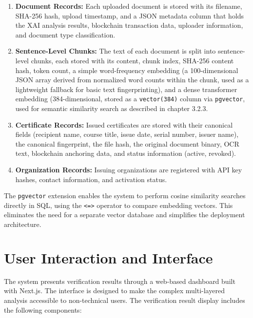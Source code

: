             \begin{enumerate}
                \item \textbf{Document Records:} Each uploaded document is stored with its filename, SHA-256 hash, upload timestamp, and a JSON metadata column that holds the XAI analysis results, blockchain transaction data, uploader information, and document type classification.
            
                \item \textbf{Sentence-Level Chunks:} The text of each document is split into sentence-level chunks, each stored with its content, chunk index, SHA-256 content hash, token count, a simple word-frequency embedding (a 100-dimensional JSON array derived from normalized word counts within the chunk, used as a lightweight fallback for basic text fingerprinting), and a dense transformer embedding (384-dimensional, stored as a \texttt{vector(384)} column via \texttt{pgvector}, used for semantic similarity search as described in chapter 3.2.3.
            
                \item \textbf{Certificate Records:} Issued certificates are stored with their canonical fields (recipient name, course title, issue date, serial number, issuer name), the canonical fingerprint, the file hash, the original document binary, OCR text, blockchain anchoring data, and status information (active, revoked).
            
                \item \textbf{Organization Records:} Issuing organizations are registered with API key hashes, contact information, and activation status.
            \end{enumerate}
            
            The \texttt{pgvector} extension enables the system to perform cosine similarity searches directly in SQL, using the \texttt{<=>} operator to compare embedding vectors. This eliminates the need for a separate vector database and simplifies the deployment architecture.
        
        \section{User Interaction and Interface}
        \label{sec:user_interface}

            The system presents verification results through a web-based dashboard built with Next.js. The interface is designed to make the complex multi-layered analysis accessible to non-technical users. The verification result display includes the following components:
            
